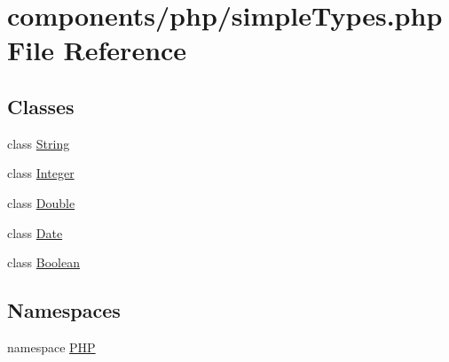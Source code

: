 \hypertarget{simple_types_8php}{
\section{components/php/simpleTypes.php File Reference}
\label{simple_types_8php}
}
\subsection*{Classes}
\begin{CompactItemize}
\item 
class \hyperlink{class_string}{String}
\item 
class \hyperlink{class_integer}{Integer}
\item 
class \hyperlink{class_double}{Double}
\item 
class \hyperlink{class_date}{Date}
\item 
class \hyperlink{class_boolean}{Boolean}
\end{CompactItemize}
\subsection*{Namespaces}
\begin{CompactItemize}
\item 
namespace \hyperlink{namespace_p_h_p}{PHP}
\end{CompactItemize}
